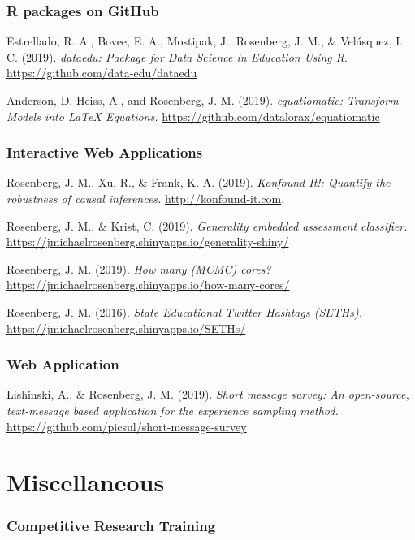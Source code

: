 \documentclass[
  11pt,
]{article}
\begin{document}
\hypertarget{r-packages-on-github}{%
\subsubsection{R packages on GitHub}\label{r-packages-on-github}}

Estrellado, R. A., Bovee, E. A., Mostipak, J., Rosenberg, J. M., \&
Velásquez, I. C. (2019). \emph{dataedu: Package for Data Science in
Education Using R}. \url{https://github.com/data-edu/dataedu}

Anderson, D. Heiss, A., and Rosenberg, J. M. (2019). \emph{equatiomatic:
Transform Models into LaTeX Equations.}
\url{https://github.com/datalorax/equatiomatic}

\hypertarget{interactive-web-applications}{%
\subsubsection{Interactive Web
Applications}\label{interactive-web-applications}}

Rosenberg, J. M., Xu, R., \& Frank, K. A. (2019). \emph{Konfound-It!:
Quantify the robustness of causal inferences.}
\url{http://konfound-it.com}.

Rosenberg, J. M., \& Krist, C. (2019). \emph{Generality embedded
assessment classifier.}
\url{https://jmichaelrosenberg.shinyapps.io/generality-shiny/}

Rosenberg, J. M. (2019). \emph{How many (MCMC) cores?}
\url{https://jmichaelrosenberg.shinyapps.io/how-many-cores/}

Rosenberg, J. M. (2016). \emph{State Educational Twitter Hashtags
(SETHs).} \url{https://jmichaelrosenberg.shinyapps.io/SETHs/}

\hypertarget{web-application}{%
\subsubsection{Web Application}\label{web-application}}

Lishinski, A., \& Rosenberg, J. M. (2019). \emph{Short message survey:
An open-source, text-message based application for the experience
sampling method.} \url{https://github.com/picsul/short-message-survey}

\hypertarget{miscellaneous}{%
\section{Miscellaneous}\label{miscellaneous}}

\hypertarget{competitive-research-training}{%
\subsubsection{Competitive Research
Training}\label{competitive-research-training}}
\end{document}
